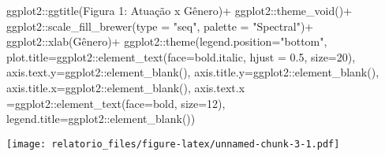 \documentclass[
]{article}
\newenvironment{Shaded}{\begin{snugshade}}{\end{snugshade}}
\newcommand{\AttributeTok}[1]{\textcolor[rgb]{0.77,0.63,0.00}{#1}}
\newcommand{\DecValTok}[1]{\textcolor[rgb]{0.00,0.00,0.81}{#1}}
\newcommand{\FloatTok}[1]{\textcolor[rgb]{0.00,0.00,0.81}{#1}}
\newcommand{\FunctionTok}[1]{\textcolor[rgb]{0.00,0.00,0.00}{#1}}
\newcommand{\NormalTok}[1]{#1}
\newcommand{\SpecialCharTok}[1]{\textcolor[rgb]{0.00,0.00,0.00}{#1}}
\newcommand{\StringTok}[1]{\textcolor[rgb]{0.31,0.60,0.02}{#1}}
\begin{document}
\begin{Shaded}
\begin{Highlighting}[]
\NormalTok{  ggplot2}\SpecialCharTok{::}\FunctionTok{ggtitle}\NormalTok{(}\StringTok{\textquotesingle{}Figura 1: Atuação x Gênero\textquotesingle{}}\NormalTok{)}\SpecialCharTok{+}
\NormalTok{  ggplot2}\SpecialCharTok{::}\FunctionTok{theme\_void}\NormalTok{()}\SpecialCharTok{+}
\NormalTok{  ggplot2}\SpecialCharTok{::}\FunctionTok{scale\_fill\_brewer}\NormalTok{(}\AttributeTok{type =} \StringTok{"seq"}\NormalTok{, }\AttributeTok{palette =} \StringTok{"Spectral"}\NormalTok{)}\SpecialCharTok{+}
\NormalTok{  ggplot2}\SpecialCharTok{::}\FunctionTok{xlab}\NormalTok{(}\StringTok{\textquotesingle{}Gênero\textquotesingle{}}\NormalTok{)}\SpecialCharTok{+}
\NormalTok{  ggplot2}\SpecialCharTok{::}\FunctionTok{theme}\NormalTok{(}\AttributeTok{legend.position=}\StringTok{"bottom"}\NormalTok{,}
                 \AttributeTok{plot.title=}\NormalTok{ggplot2}\SpecialCharTok{::}\FunctionTok{element\_text}\NormalTok{(}\AttributeTok{face=}\StringTok{\textquotesingle{}bold.italic\textquotesingle{}}\NormalTok{,}
                                                  \AttributeTok{hjust =} \FloatTok{0.5}\NormalTok{, }\AttributeTok{size=}\DecValTok{20}\NormalTok{),}
                 \AttributeTok{axis.text.y=}\NormalTok{ggplot2}\SpecialCharTok{::}\FunctionTok{element\_blank}\NormalTok{(),}
                 \AttributeTok{axis.title.y=}\NormalTok{ggplot2}\SpecialCharTok{::}\FunctionTok{element\_blank}\NormalTok{(),}
                 \AttributeTok{axis.title.x=}\NormalTok{ggplot2}\SpecialCharTok{::}\FunctionTok{element\_blank}\NormalTok{(),}
                 \AttributeTok{axis.text.x =}\NormalTok{ggplot2}\SpecialCharTok{::}\FunctionTok{element\_text}\NormalTok{(}\AttributeTok{face=}\StringTok{\textquotesingle{}bold\textquotesingle{}}\NormalTok{, }\AttributeTok{size=}\DecValTok{12}\NormalTok{),}
                 \AttributeTok{legend.title=}\NormalTok{ggplot2}\SpecialCharTok{::}\FunctionTok{element\_blank}\NormalTok{())}
\end{Highlighting}
\end{Shaded}

\texttt{[image: relatorio\_files/figure-latex/unnamed-chunk-3-1.pdf]}
\end{document}
